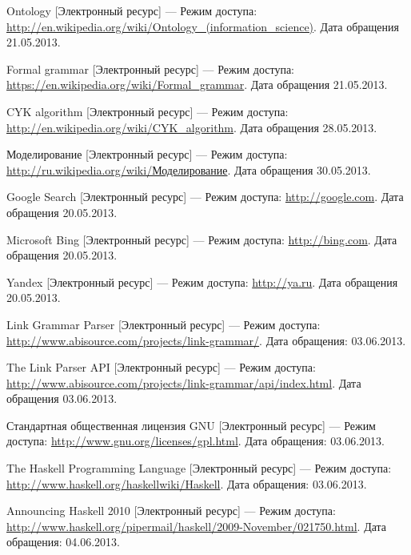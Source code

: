 \begin{thebibliography}{99}
	Ontology [Электронный ресурс] --- Режим доступа: \url{http://en.wikipedia.org/wiki/Ontology_(information_science)}. Дата обращения 21.05.2013. 

	Formal grammar [Электронный ресурс] --- Режим доступа: \url{https://en.wikipedia.org/wiki/Formal_grammar}. Дата обращения 21.05.2013.

	CYK algorithm [Электронный ресурс] --- Режим доступа: \url{http://en.wikipedia.org/wiki/CYK_algorithm}. Дата обращения 28.05.2013.

	Моделирование [Электронный ресурс] --- Режим доступа: \url{http://ru.wikipedia.org/wiki/Моделирование}. Дата обращения 30.05.2013.

	Google Search [Электронный ресурс] --- Режим доступа: \url{http://google.com}. Дата обращения 20.05.2013.

	Microsoft Bing [Электронный ресурс] --- Режим доступа: \url{http://bing.com}. Дата обращения 20.05.2013.

	Yandex [Электронный ресурс] --- Режим доступа: \url{http://ya.ru}. Дата обращения 20.05.2013.

	Link Grammar Parser [Электронный ресурс] --- Режим доступа: \url{http://www.abisource.com/projects/link-grammar/}. Дата обращения: 03.06.2013.

	The Link Parser API [Электронный ресурс] --- Режим доступа: \url{http://www.abisource.com/projects/link-grammar/api/index.html}. Дата обращения 03.06.2013.

	Стандартная общественная лицензия GNU [Электронный ресурс] --- Режим доступа: \url{http://www.gnu.org/licenses/gpl.html}. Дата обращения: 03.06.2013.

	The Haskell Programming Language [Электронный ресурс] --- Режим доступа: \url{http://www.haskell.org/haskellwiki/Haskell}. Дата обращения: 03.06.2013.

	Announcing Haskell 2010 [Электронный ресурс] --- Режим доступа: \url{http://www.haskell.org/pipermail/haskell/2009-November/021750.html}. Дата обращения: 04.06.2013.
\end{thebibliography}